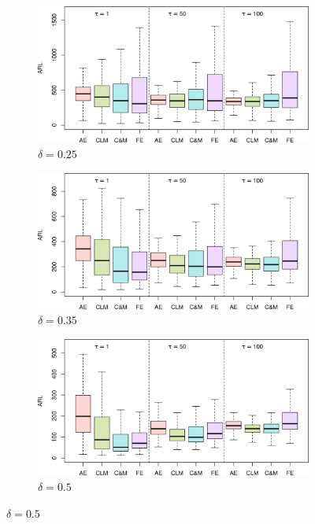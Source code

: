 \begin{figure}
\centering
\begin{subfigure}{0.49\textwidth}
  \centering
  \caption{$ \delta = 0.25$}
  \label{fig:lambda=0.15/theta=4.0/delta=0.25}
  \includegraphics[width=\textwidth]{img/sims/theta=4.0_signedEWMA(l = 0.15, upw = true, L = 1.0)/delta=0.25.png}
\end{subfigure}
\begin{subfigure}{0.49\textwidth}
  \centering
  \caption{$ \delta = 0.35$}
  \label{fig:lambda=0.15/theta=4.0/delta=0.35}
  \includegraphics[width=\textwidth]{img/sims/theta=4.0_signedEWMA(l = 0.15, upw = true, L = 1.0)/delta=0.35.png}
\end{subfigure}
\begin{subfigure}{0.49\textwidth}
  \centering
  \caption{$ \delta = 0.5$}
  \label{fig:lambda=0.15/theta=4.0/delta=0.5}
  \includegraphics[width=\textwidth]{img/sims/theta=4.0_signedEWMA(l = 0.15, upw = true, L = 1.0)/delta=0.50.png}

\end{subfigure}
\end{figure}
